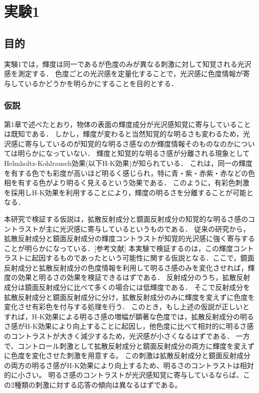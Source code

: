 \chapter{実験1}

\section{目的}

    実験1では，輝度は同一であるが色度のみが異なる刺激に対して知覚される光沢感を測定する．
    色度ごとの光沢感を定量化することで，光沢感に色度情報が寄与しているかどうかを明らかにすることを目的とする．

    \subsection{仮説}

        第1章で述べたとおり，物体の表面の輝度成分が光沢感知覚に寄与していることは既知である．
        しかし，輝度が変わると当然知覚的な明るさも変わるため，光沢感に寄与しているのが知覚的な明るさ感なのか輝度情報そのものなのかについては明らかになっていない．
        輝度と知覚的な明るさ感が分離される現象としてHelmholtz-Kohlrausch効果(以下H-K効果)が知られている．
        これは，同一の輝度を有する色でも彩度が高いほど明るく感じられ，特に青・紫・赤紫・赤などの色相を有する色がより明るく見えるという効果である．
        このように，有彩色刺激を採用しH-K効果を利用することにより，輝度の明るさを分離することが可能となる．

        本研究で検証する仮説は，拡散反射成分と鏡面反射成分の知覚的な明るさ感のコントラストが主に光沢感に寄与しているというものである．
        従来の研究から，拡散反射成分と鏡面反射成分の輝度コントラストが知覚的光沢感に強く寄与することが明らかになっている．[参考文献]
        本実験で検証するのは，この輝度コントラストに起因するものであったという可能性に関する仮説となる．ここで，鏡面反射成分と拡散反射成分の色度情報を利用して明るさ感のみを変化させれば，輝度の効果と明るさの効果を検証できるはずである．
        反射成分のうち，拡散反射成分は鏡面反射成分に比べて多くの場合には低輝度である．
        そこで反射成分を拡散反射成分と鏡面反射成分に分け，拡散反射成分のみに輝度を変えずに色度を変化させ有彩色を付与する処理を行う．
        このとき，もし上述の仮説が正しいとすれば，H-K効果による明るさ感の増幅が顕著な色度では，拡散反射成分の明るさ感がH-K効果により向上することに起因し，他色度に比べて相対的に明るさ感のコントラストが大きく減少するため，光沢感が小さくなるはずである．
        一方で、コントロール刺激として拡散反射成分と鏡面反射成分の両方に輝度を変えずに色度を変化させた刺激を用意する。
        この刺激は拡散反射成分と鏡面反射成分の両方の明るさ感がH-K効果により向上するため、明るさのコントラストは相対的に小さい。
        明るさ感のコントラストが光沢感知覚に寄与しているならば、この2種類の刺激に対する応答の傾向は異なるはずである。

